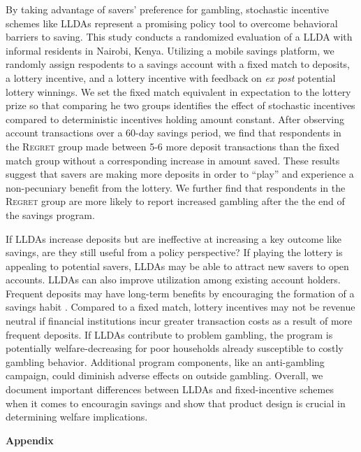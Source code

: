 \documentclass[11pt]{article}
\begin{document}
		By taking advantage of savers' preference for gambling, stochastic incentive schemes like LLDAs represent a promising policy tool to overcome behavioral barriers to saving. This study conducts a randomized evaluation of a LLDA with informal residents in Nairobi, Kenya. Utilizing a mobile savings platform, we randomly assign respodents to a savings account with a fixed match to deposits, a lottery incentive, and a lottery incentive with feedback on \textit{ex post} potential lottery winnings. We set the fixed match equivalent in expectation to the lottery prize so that comparing he two groups identifies the effect of stochastic incentives compared to deterministic incentives holding amount constant. After observing account transactions over a 60-day savings period, we find that respondents in the \textsc{Regret} group made between 5-6 more deposit transactions than the fixed match group without a corresponding increase in amount saved. These results suggest that savers are making more deposits in order to ``play'' and experience a non-pecuniary benefit from the lottery. We further find that respondents in the \textsc{Regret} group are more likely to report increased gambling after the the end of the savings program.

		If LLDAs increase deposits but are ineffective at increasing a key outcome like savings, are they still useful from a policy perspective? If playing the lottery is appealing to potential savers, LLDAs may be able to attract new savers to open  accounts. LLDAs can also improve utilization among existing account holders. Frequent deposits may have long-term benefits by encouraging the formation of a savings habit . Compared to a fixed match, lottery incentives may not be revenue neutral if financial institutions incur greater transaction costs as a result of more frequent deposits. If LLDAs contribute to problem gambling, the program is potentially welfare-decreasing for poor households already susceptible to costly gambling behavior. Additional program components, like an anti-gambling campaign, could diminish adverse effects on outside gambling. Overall, we document important differences between LLDAs and fixed-incentive schemes when it comes to encouragin savings and show that product design is crucial in determining welfare implications.




\newpage

\textbf{Appendix}
\end{document}
